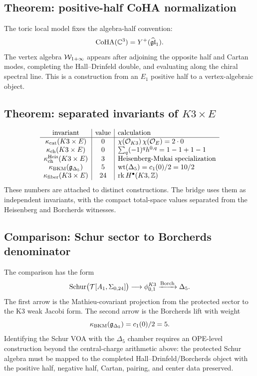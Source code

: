 \subsection{Theorem: positive-half CoHA normalization}
\label{subsec:positive-half-coha-normalization}

The toric local model fixes the algebra-half convention:
\[
  \mathrm{CoHA}(\mathbb{C}^3)=Y^+(\widehat{\mathfrak{gl}}_1).
\]
The vertex algebra $\mathcal{W}_{1+\infty}$ appears after adjoining the
opposite half and Cartan modes, completing the Hall--Drinfeld double,
and evaluating along the chiral spectral line.  This is a construction
from an $E_1$ positive half to a vertex-algebraic object.

\subsection{Theorem: separated invariants of $K3\times E$}
\label{subsec:k3e-separated-invariants}

\[
\begin{array}{c|c|l}
\text{invariant} & \text{value} & \text{calculation}\\
\hline
\kappa_{\mathrm{cat}}(K3\times E) & 0 &
  \chi(\mathcal{O}_{K3})\,\chi(\mathcal{O}_E)=2\cdot 0\\
\kappa_{\mathrm{ch}}(K3\times E) & 0 &
  \sum_q(-1)^qh^{0,q}=1-1+1-1\\
\kappa_{\mathrm{ch}}^{\mathrm{Heis}}(K3\times E) & 3 &
  \text{Heisenberg-Mukai specialization}\\
\kappa_{\mathrm{BKM}}(\mathfrak g_{\Delta_5}) & 5 &
  \mathrm{wt}(\Delta_5)=c_1(0)/2=10/2\\
\kappa_{\mathrm{fiber}}(K3\times E) & 24 &
  \operatorname{rk} H^\bullet(K3,\mathbb{Z})
\end{array}
\]
These numbers are attached to distinct constructions.  The bridge uses
them as independent invariants, with the compact total-space values
separated from the Heisenberg and Borcherds witnesses.

\subsection{Comparison: Schur sector to Borcherds denominator}
\label{subsec:schur-borcherds-comparison}

The comparison has the form
\[
  \operatorname{Schur}\bigl(\mathcal{T}[A_1,\Sigma_{0,24}]\bigr)
  \longrightarrow
  \phi^{K3}_{0,1}
  \xrightarrow{\operatorname{Borch}}
  \Delta_5.
\]
The first arrow is the Mathieu-covariant projection from the protected
sector to the K3 weak Jacobi form.  The second arrow is the
Borcherds lift with weight
\[
  \kappa_{\mathrm{BKM}}(\mathfrak g_{\Delta_5})=c_1(0)/2=5.
\]
Identifying the Schur VOA with the $\Delta_5$ chamber requires an
OPE-level construction beyond the central-charge arithmetic above:
the protected Schur algebra must be mapped to the completed
Hall--Drinfeld/Borcherds object with the positive half, negative half,
Cartan, pairing, and center data preserved.

